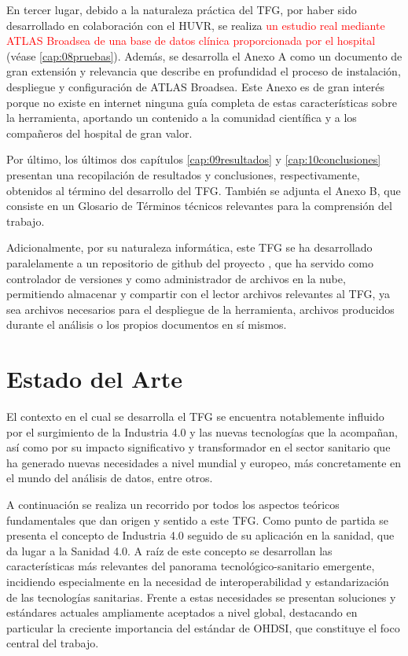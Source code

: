 En tercer lugar, debido a la naturaleza práctica del TFG, por haber sido desarrollado en colaboración con el HUVR, se realiza \textcolor{red}{un estudio real mediante ATLAS Broadsea de una base de datos clínica proporcionada por el hospital} (véase \ref{cap:08pruebas}). Además, se desarrolla el Anexo A como un documento de gran extensión y relevancia que describe en profundidad el proceso de instalación, despliegue y configuración de ATLAS Broadsea. Este Anexo es de gran interés porque no existe en internet ninguna guía completa de estas características sobre la herramienta, aportando un contenido a la comunidad científica y a los compañeros del hospital de gran valor.

Por último, los últimos dos capítulos \ref{cap:09resultados} y \ref{cap:10conclusiones} presentan una recopilación de resultados y conclusiones, respectivamente, obtenidos al término del desarrollo del TFG. También se adjunta el Anexo B, que consiste en un Glosario de Términos técnicos relevantes para la comprensión del trabajo. 

Adicionalmente, por su naturaleza informática, este TFG se ha desarrollado paralelamente a un repositorio de github del proyecto \cite{vallealonsodc}, que ha servido como controlador de versiones y como administrador de archivos en la nube, permitiendo almacenar y compartir con el lector archivos relevantes al TFG, ya sea archivos necesarios para el despliegue de la herramienta, archivos producidos durante el análisis o los propios documentos en sí mismos.

\section{Estado del Arte} \label{sec:01EstadoArte} 
 
El contexto en el cual se desarrolla el TFG se encuentra notablemente influido por el surgimiento de la Industria 4.0 y las nuevas tecnologías que la acompañan, así como por su impacto significativo y transformador en el sector sanitario que ha generado nuevas necesidades a nivel mundial y europeo, más concretamente en el mundo del análisis de datos, entre otros. %

A continuación se realiza un recorrido por todos los aspectos teóricos fundamentales que dan origen y sentido a este TFG. Como punto de partida se presenta el concepto de Industria 4.0 seguido de su aplicación en la sanidad, que da lugar a la Sanidad 4.0. A raíz de este concepto se desarrollan las características más relevantes del panorama tecnológico-sanitario emergente, incidiendo especialmente en la necesidad de interoperabilidad y estandarización de las tecnologías sanitarias. Frente a estas necesidades se presentan soluciones y estándares actuales ampliamente aceptados a nivel global, destacando en particular la creciente importancia del estándar de OHDSI, que constituye el foco central del trabajo.

